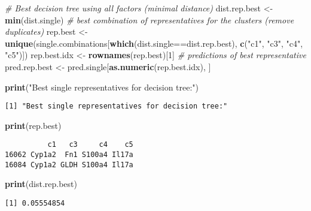 \documentclass[]{article}
\newenvironment{Shaded}{\begin{snugshade}}{\end{snugshade}}
\newcommand{\KeywordTok}[1]{\textcolor[rgb]{0.13,0.29,0.53}{\textbf{{#1}}}}
\newcommand{\DecValTok}[1]{\textcolor[rgb]{0.00,0.00,0.81}{{#1}}}
\newcommand{\StringTok}[1]{\textcolor[rgb]{0.31,0.60,0.02}{{#1}}}
\newcommand{\CommentTok}[1]{\textcolor[rgb]{0.56,0.35,0.01}{\textit{{#1}}}}
\newcommand{\NormalTok}[1]{{#1}}
\begin{document}
\begin{Shaded}
\begin{Highlighting}[]
\CommentTok{# Best decision tree using all factors (minimal distance)}
\NormalTok{dist.rep.best <-}\StringTok{ }\KeywordTok{min}\NormalTok{(dist.single)}
\CommentTok{# best combination of representatives for the clusters (remove duplicates)}
\NormalTok{rep.best <-}\StringTok{ }\KeywordTok{unique}\NormalTok{(single.combinations[}\KeywordTok{which}\NormalTok{(dist.single==dist.rep.best), }
                                       \KeywordTok{c}\NormalTok{(}\StringTok{"c1"}\NormalTok{, }\StringTok{"c3"}\NormalTok{, }\StringTok{"c4"}\NormalTok{, }\StringTok{"c5"}\NormalTok{)])}
\NormalTok{rep.best.idx <-}\StringTok{ }\KeywordTok{rownames}\NormalTok{(rep.best)[}\DecValTok{1}\NormalTok{]}
\CommentTok{# predictions of best representative}
\NormalTok{pred.rep.best <-}\StringTok{ }\NormalTok{pred.single[}\KeywordTok{as.numeric}\NormalTok{(rep.best.idx), ]}

\KeywordTok{print}\NormalTok{(}\StringTok{"Best single representatives for decision tree:"}\NormalTok{)}
\end{Highlighting}
\end{Shaded}

\begin{verbatim}
[1] "Best single representatives for decision tree:"
\end{verbatim}

\begin{Shaded}
\begin{Highlighting}[]
\KeywordTok{print}\NormalTok{(rep.best)}
\end{Highlighting}
\end{Shaded}

\begin{verbatim}
          c1   c3     c4    c5
16062 Cyp1a2  Fn1 S100a4 Il17a
16084 Cyp1a2 GLDH S100a4 Il17a
\end{verbatim}

\begin{Shaded}
\begin{Highlighting}[]
\KeywordTok{print}\NormalTok{(dist.rep.best)}
\end{Highlighting}
\end{Shaded}

\begin{verbatim}
[1] 0.05554854
\end{verbatim}
\end{document}

